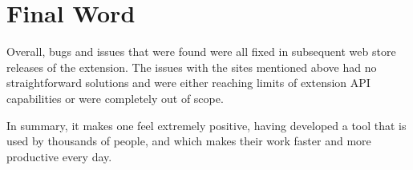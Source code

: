 \documentclass[bsc,frontabs,twoside,singlespacing,parskip,deptreport]{infthesis}
\begin{document}
\section{Final Word}
Overall, bugs and issues that were found were all fixed in subsequent web store releases of the extension. The issues with the sites mentioned above had no straightforward solutions and were either reaching limits of extension API capabilities or were completely out of scope.

In summary, it makes one feel extremely positive, having developed a tool that is used by thousands of people, and which makes their work faster and more productive every day.



\end{document}
